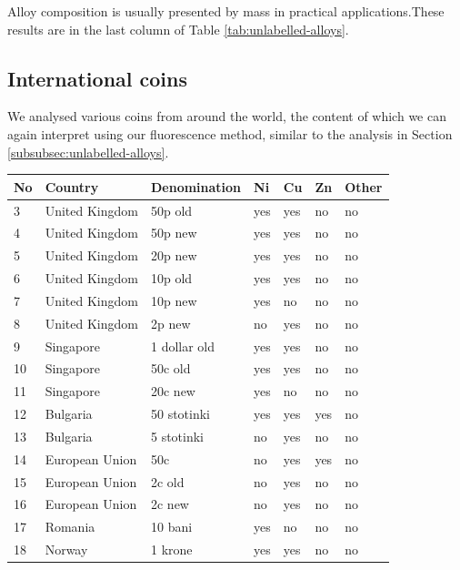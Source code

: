 \documentclass[11pt,a4paper,twoside,onecolumn]{article}
\begin{document}
Alloy composition is usually presented by mass in practical applications.These results are in the last column of Table \ref{tab:unlabelled-alloys}.

\subsection{International coins}
We analysed various coins from around the world, the content of which we can again interpret using our fluorescence method, similar to the analysis in Section \ref{subsubsec:unlabelled-alloys}.

\begin{table}[!htbp]
    \centering
    \begin{tabular}{@{}lllllll@{}}
    \toprule
    No & Country        & Denomination   & Ni  & Cu  & Zn  & Other \\ \midrule
    3  & United Kingdom & 50p old        & yes & yes & no  & no    \\
    4  & United Kingdom & 50p new        & yes & yes & no  & no    \\
    5  & United Kingdom & 20p new        & yes & yes & no  & no    \\
    6  & United Kingdom & 10p old        & yes & yes & no  & no    \\
    7  & United Kingdom & 10p new        & yes & no  & no  & no    \\
    8  & United Kingdom & 2p new         & no  & yes & no  & no    \\
    9  & Singapore      & 1 dollar old   & yes & yes & no  & no    \\
    10 & Singapore      & 50c old        & yes & yes & no  & no    \\
    11 & Singapore      & 20c new        & yes & no  & no  & no    \\
    12 & Bulgaria       & 50 stotinki    & yes & yes & yes & no    \\
    13 & Bulgaria       & 5 stotinki     & no  & yes & no  & no    \\
    14 & European Union & 50c            & no  & yes & yes & no    \\
    15 & European Union & 2c old         & no  & yes & no  & no    \\
    16 & European Union & 2c new         & no  & yes & no  & no    \\
    17 & Romania        & 10 bani        & yes & no  & no  & no    \\
    18 & Norway         & 1 krone        & yes & yes & no  & no    \\

\end{tabular}
\end{table}
\end{document}
